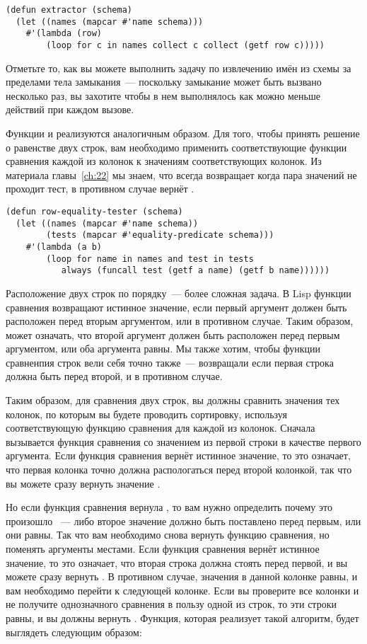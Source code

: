 \begin{lstlisting}
(defun extractor (schema)
  (let ((names (mapcar #'name schema)))
    #'(lambda (row)
        (loop for c in names collect c collect (getf row c)))))
\end{lstlisting}

Отметьте то, как вы можете выполнить задачу по извлечению имён из схемы за пределами тела
замыкания~--- поскольку замыкание может быть вызвано несколько раз, вы захотите чтобы в нем
выполнялось как можно меньше действий при каждом вызове.

Функции  и  реализуются аналогичным
образом.  Для того, чтобы принять решение о равенстве двух строк, вам необходимо применить
соответствующие функции сравнения каждой из колонок к значениям соответствующих колонок.
Из материала главы~\ref{ch:22} мы знаем, что  всегда возвращает 
когда пара значений не проходит тест, в противном случае  вернёт .

\begin{lstlisting}
(defun row-equality-tester (schema)
  (let ((names (mapcar #'name schema))
        (tests (mapcar #'equality-predicate schema)))
    #'(lambda (a b)
        (loop for name in names and test in tests
           always (funcall test (getf a name) (getf b name))))))
\end{lstlisting}

Расположение двух строк по порядку~--- более сложная задача.  В Lisp функции сравнения
возвращают истинное значение, если первый аргумент должен быть расположен перед вторым
аргументом, или  в противном случае.  Таким образом,  может означать,
что второй аргумент должен быть расположен перед первым аргументом, или оба аргумента
равны. Мы также хотим, чтобы функции сравненпия строк вели себя точно также~--- возвращали
 если первая строка должна быть перед второй, и  в противном случае.

Таким образом, для сравнения двух строк, вы должны сравнить значения тех колонок, по
которым вы будете проводить сортировку, используя соответствующую функцию сравнения для
каждой из колонок.  Сначала вызывается функция сравнения со значением из первой строки в
качестве первого аргумента.  Если функция сравнения вернёт истинное значение, то это
означает, что первая колонка точно должна распологаться перед второй колонкой, так что вы
можете сразу вернуть значение .

Но если функция сравнения вернула , то вам нужно определить почему это произошло
~--- либо второе значение должно быть поставлено перед первым, или они равны.  Так что вам
необходимо снова вернуть функцию сравнения, но поменять аргументы местами.  Если функция
сравнения вернёт истинное значение, то это означает, что вторая строка должна стоять перед
первой, и вы можете сразу вернуть .  В противном случае, значения в данной
колонке равны, и вам необходимо перейти к следующей колонке.  Если вы проверите все
колонки и не получите однозначного сравнения в пользу одной из строк, то эти строки равны,
и вы должны вернуть .  Функция, которая реализует такой алгоритм, будет
выглядеть следующим образом:

